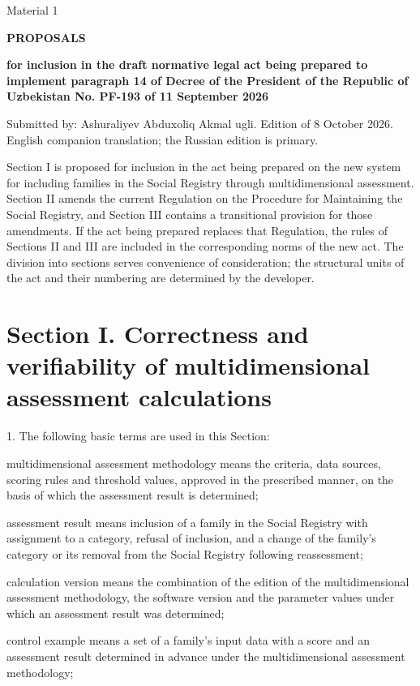 \documentclass[14pt,a4paper]{extarticle}
\newcommand{\norm}[1]{\par\noindent\hspace*{1.27cm}#1. }
\begin{document}
\begin{flushright}Material 1\end{flushright}
\begin{center}\textbf{PROPOSALS}\par
\textbf{for inclusion in the draft normative legal act being prepared to implement paragraph 14 of Decree of the President of the Republic of Uzbekistan No. PF-193 of 11 September 2026}\end{center}

\noindent Submitted by: Ashuraliyev Abduxoliq Akmal ugli. Edition of 8 October 2026. English companion translation; the Russian edition is primary.

Section I is proposed for inclusion in the act being prepared on the new system for including families in the Social Registry through multidimensional assessment. Section II amends the current Regulation on the Procedure for Maintaining the Social Registry, and Section III contains a transitional provision for those amendments. If the act being prepared replaces that Regulation, the rules of Sections II and III are included in the corresponding norms of the new act. The division into sections serves convenience of consideration; the structural units of the act and their numbering are determined by the developer.

\section*{Section I. Correctness and verifiability of multidimensional assessment calculations}

\norm{1}The following basic terms are used in this Section:

multidimensional assessment methodology means the criteria, data sources, scoring rules and threshold values, approved in the prescribed manner, on the basis of which the assessment result is determined;

assessment result means inclusion of a family in the Social Registry with assignment to a category, refusal of inclusion, and a change of the family’s category or its removal from the Social Registry following reassessment;

calculation version means the combination of the edition of the multidimensional assessment methodology, the software version and the parameter values under which an assessment result was determined;

control example means a set of a family’s input data with a score and an assessment result determined in advance under the multidimensional assessment methodology;
\end{document}
